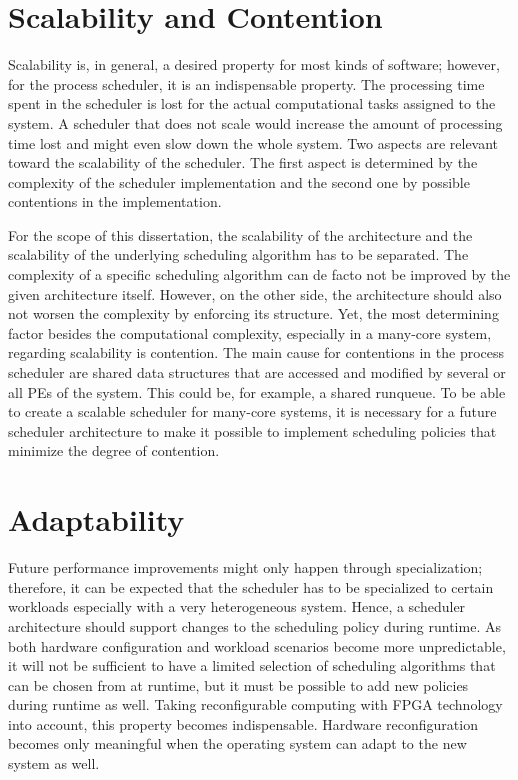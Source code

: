 \section{Scalability and Contention}%
\label{sec:requirements:scale}

Scalability is, in general, a desired property for most kinds of software; however, for the process scheduler, it is an indispensable property. The processing time spent in the scheduler is lost for the actual computational tasks assigned to the system. A scheduler that does not scale would increase the amount of processing time lost and might even slow down the whole system. Two aspects are relevant toward the scalability of the scheduler. The first aspect is determined by the complexity of the scheduler implementation and the second one by possible contentions in the implementation.

For the scope of this dissertation, the scalability of the architecture and the scalability of the underlying scheduling algorithm has to be separated. The complexity of a specific scheduling algorithm can de facto not be improved by the given architecture itself. However, on the other side, the architecture should also not worsen the complexity by enforcing its structure. Yet, the most determining factor besides the computational complexity, especially in a many-core system, regarding scalability is contention. The main cause for contentions in the process scheduler are shared data structures that are accessed and modified by several or all \acp{PE} of the system. This could be, for example, a shared runqueue. To be able to create a scalable scheduler for many-core systems, it is necessary for a future scheduler architecture to make it possible to implement scheduling policies that minimize the degree of contention.

\section{Adaptability}%
\label{sec:requirements:adaptability}

Future performance improvements might only happen through specialization; therefore, it can be expected that the scheduler has to be specialized to certain workloads especially with a very heterogeneous system. Hence, a scheduler architecture should support changes to the scheduling policy during runtime. As both hardware configuration and workload scenarios become more unpredictable, it will not be sufficient to have a limited selection of scheduling algorithms that can be chosen from at runtime, but it must be possible to add new policies during runtime as well. Taking reconfigurable computing with \ac{FPGA} technology into account, this property becomes indispensable. Hardware reconfiguration becomes only meaningful when the operating system can adapt to the new system as well.

